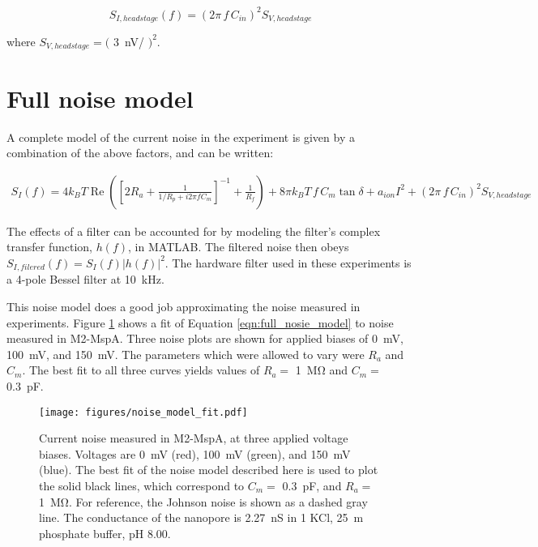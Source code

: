 \begin{equation}
S_{I,headstage}(f) = (2 \pi \, f \, C_{in})^2 S_{V,headstage}
\label{eqn:headstage}
\end{equation}

\noindent
where $S_{V,headstage} = ($ \SI{3}{\nV/\sqrt{\Hz}} $)^2$.

\section{Full noise model}
\label{sec:full_noise_model}

A complete model of the current noise in the experiment is given by a combination of the above factors, and can be written:

\begin{multline}
S_I(f) = 4 k_B T \operatorname{Re} \left( \left[ 2 R_a + \frac{1}{ 1/R_p + i 2 \pi f C_m } \right]^{-1} + \frac{1}{R_f} \right) + 8 \pi k_B T \, f \, C_m \tan \delta + a_{ion} I^2 + (2 \pi \, f \, C_{in})^2 S_{V,headstage}
\label{eqn:full_nosie_model}
\end{multline}

The effects of a filter can be accounted for by modeling the filter's complex transfer function, $h(f)$, in MATLAB.  The filtered noise then obeys $S_{I,filered}(f) = S_I(f) |h(f)|^2$.  The hardware filter used in these experiments is a 4-pole Bessel filter at \SI{10}{\kHz}.

This noise model does a good job approximating the noise measured in experiments.  Figure \ref{fig:noise_model_fit} shows a fit of Equation \ref{eqn:full_nosie_model} to noise measured in M2-MspA.  Three noise plots are shown for applied biases of \SI{0}{\mV}, \SI{100}{\mV}, and \SI{150}{\mV}.  The parameters which were allowed to vary were $R_a$ and $C_m$.  The best fit to all three curves yields values of $R_a = $ \SI{1}{\mega\ohm} and $C_m = $ \SI{0.3}{\pF}.

\begin{figure}[h]
\begin{centering}
\texttt{[image: figures/noise\_model\_fit.pdf]}
\caption[Current noise in MspA fit to a model]{Current noise measured in M2-MspA, at three applied voltage biases.  Voltages are \SI{0}{\mV} (red), \SI{100}{\mV} (green), and \SI{150}{\mV} (blue).  The best fit of the noise model described here is used to plot the solid black lines, which correspond to $C_m = $ \SI{0.3}{\pF}, and $R_a = $ \SI{1}{\mega\ohm}.  For reference, the Johnson noise is shown as a dashed gray line.  The conductance of the nanopore is \SI{2.27}{\nano\siemens} in \SI{1}{\Molar} KCl, \SI{25}{\m\Molar} phosphate buffer, pH \num{8.00}.}
\label{fig:noise_model_fit}
\end{centering}
\end{figure}

